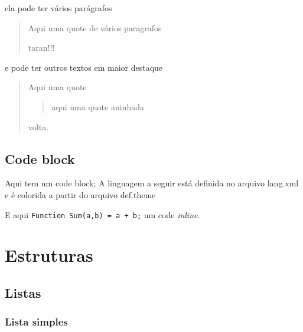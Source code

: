 ela pode ter vários parágrafos

\begin{quote}
Aqui uma quote de vários paragrafos

taran!!!
\end{quote}

e pode ter outros textos em maior destaque

\begin{quote}
Aqui uma quote

\begin{quote}
aqui uma quote aninhada
\end{quote}

volta.
\end{quote}

\hypertarget{code-block}{%
\subsection{Code block}\label{code-block}}

Aqui tem um code block; A linguagem a seguir está definida no arquivo
lang.xml e é colorida a partir do arquivo def.theme

\begin{Shaded}
\begin{Highlighting}[numbers=left,,]
\end{Highlighting}
\end{Shaded}

E aqui \texttt{Function\ Sum(a,b)\ =\ a\ +\ b;} um code \emph{inline}.

\hypertarget{estruturas}{%
\section{Estruturas}\label{estruturas}}

\hypertarget{listas}{%
\subsection{Listas}\label{listas}}

\hypertarget{lista-simples}{%
\subsubsection{Lista simples}\label{lista-simples}}

